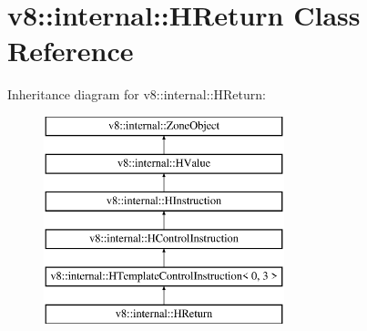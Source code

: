 \hypertarget{classv8_1_1internal_1_1_h_return}{}\section{v8\+:\+:internal\+:\+:H\+Return Class Reference}
\label{classv8_1_1internal_1_1_h_return}
Inheritance diagram for v8\+:\+:internal\+:\+:H\+Return\+:\begin{figure}[H]
\begin{center}
\leavevmode
\includegraphics[height=6.000000cm]{classv8_1_1internal_1_1_h_return}
\end{center}
\end{figure}
